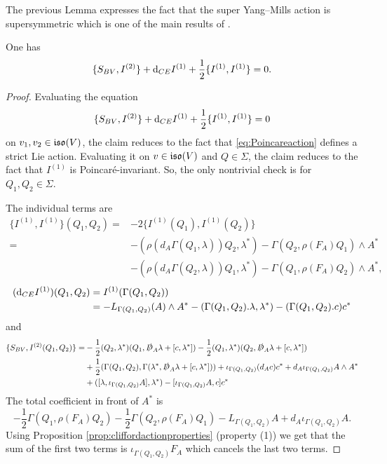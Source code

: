 \documentclass[10pt, oneside]{article}
\begin{document}
\begin{remark}
The previous Lemma expresses the fact that the super Yang--Mills action is supersymmetric which is one of the main results of \cite{BaezHuerta}.
\end{remark}

\begin{lemma}
One has
\[\{S_{BV}, I^{(2)}\} + {\rm d}_{CE} I^{(1)} + \frac{1}{2}\{I^{(1)}, I^{(1)}\} = 0.\]
\end{lemma}
\begin{proof}
Evaluating the equation
\[\{S_{BV}, I^{(2)}\} + {\rm d}_{CE} I^{(1)} + \frac{1}{2}\{I^{(1)}, I^{(1)}\} = 0\]
on $v_1, v_2\in \mathfrak{iso}(V)$, the claim reduces to the fact that \eqref{eq:Poincareaction} defines a strict Lie action. Evaluating it on $v\in\mathfrak{iso}(V)$ and $Q\in\Sigma$, the claim reduces to the fact that $I^{(1)}$ is Poincar\'{e}-invariant. So, the only nontrivial check is for $Q_1,Q_2\in\Sigma$.

The individual terms are
\begin{align*}
\{I^{(1)}, I^{(1)}\}(Q_1, Q_2) = &-2\{I^{(1)}(Q_1), I^{(1)}(Q_2)\} \\
= &-(\rho(d_A \Gamma(Q_1, \lambda)) Q_2, \lambda^*) - \Gamma(Q_2, \rho(F_A)Q_1)\wedge A^* \\
&-(\rho(d_A \Gamma(Q_2, \lambda)) Q_1, \lambda^*) - \Gamma(Q_1, \rho(F_A)Q_2)\wedge A^*,
\end{align*}
\begin{align*}
({\rm d}_{CE} I^{(1)})(Q_1, Q_2) &= I^{(1)}(\Gamma(Q_1, Q_2)) \\
&= -L_{\Gamma(Q_1, Q_2)}(A)\wedge A^* -(\Gamma(Q_1, Q_2).\lambda, \lambda^*) - (\Gamma(Q_1, Q_2).c) c^*
\end{align*}
and
\begin{align*}
\{S_{BV}, I^{(2)}(Q_1, Q_2)\} = &-\frac{1}{2}(Q_2, \lambda^*)(Q_1, \slashed{D}_A \lambda + [c, \lambda^*]) - \frac{1}{2}(Q_1, \lambda^*)(Q_2, \slashed{D}_A \lambda + [c, \lambda^*]) \\
&+\frac{1}{2}(\Gamma(Q_1, Q_2), \Gamma(\lambda^*, \slashed{D}_A \lambda + [c, \lambda^*])) + \iota_{\Gamma(Q_1, Q_2)}(d_A c) c^* + d_A\iota_{\Gamma(Q_1, Q_2)} A\wedge A^* \\
&+ ([\lambda, \iota_{\Gamma(Q_1, Q_2)}A], \lambda^*) - [\iota_{\Gamma(Q_1, Q_2)} A, c] c^*
\end{align*}
The total coefficient in front of $A^*$ is
\[-\frac{1}{2}\Gamma(Q_1, \rho(F_A)Q_2) - \frac{1}{2}\Gamma(Q_2, \rho(F_A) Q_1) - L_{\Gamma(Q_1, Q_2)} A + d_A \iota_{\Gamma(Q_1, Q_2)} A.\]
Using Proposition \ref{prop:cliffordactionproperties} (property (1)) we get that the sum of the first two terms is $\iota_{\Gamma(Q_1, Q_2)}F_A$ which cancels the last two terms.


\end{proof}
\end{document}
